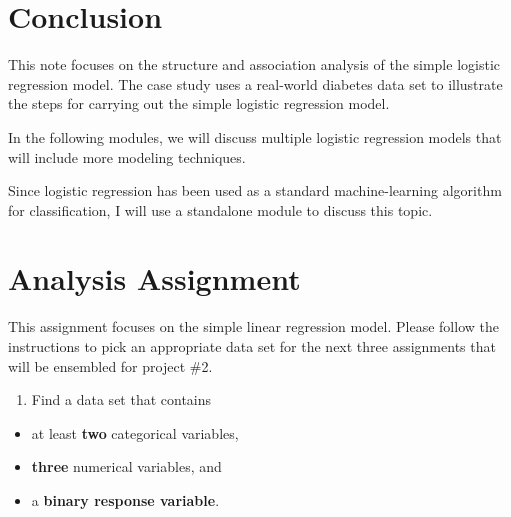\documentclass[
]{book}
\providecommand{\tightlist}{%
  \setlength{\itemsep}{0pt}\setlength{\parskip}{0pt}}
\begin{document}
\hypertarget{conclusion}{%
\section{Conclusion}\label{conclusion}}

This note focuses on the structure and association analysis of the simple logistic regression model. The case study uses a real-world diabetes data set to illustrate the steps for carrying out the simple logistic regression model.

In the following modules, we will discuss multiple logistic regression models that will include more modeling techniques.

Since logistic regression has been used as a standard machine-learning algorithm for classification, I will use a standalone module to discuss this topic.

\hypertarget{analysis-assignment}{%
\section{Analysis Assignment}\label{analysis-assignment}}

This assignment focuses on the simple linear regression model. Please follow the instructions to pick an appropriate data set for the next three assignments that will be ensembled for project \#2.

\begin{enumerate}
\def\labelenumi{\arabic{enumi}.}
\tightlist
\item
  Find a data set that contains
\end{enumerate}

\begin{itemize}
\tightlist
\item
  at least \textbf{two} categorical variables,
\item
  \textbf{three} numerical variables, and
\item
  a \textbf{binary response variable}.
\end{itemize}
\end{document}

